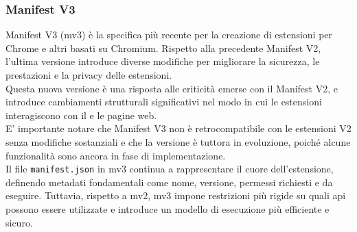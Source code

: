 \subsubsection{Manifest V3}
\noindent Manifest V3 (\acrshort{mv3}) è la specifica più recente per la creazione di estensioni per Chrome e altri  basati su Chromium. Rispetto alla precedente Manifest V2, l'ultima versione introduce diverse modifiche per migliorare la sicurezza, le prestazioni e la privacy delle estensioni.  \\
Questa nuova versione è una risposta alle criticità emerse con il Manifest V2, e introduce cambiamenti strutturali significativi nel modo in cui le estensioni interagiscono con il  e le pagine web.\\
E' importante notare che Manifest V3 non è retrocompatibile con le estensioni V2 senza modifiche sostanziali e che la versione è tuttora in evoluzione, poiché alcune funzionalità sono ancora in fase di implementazione.\\
Il file \texttt{manifest.json} in \acrshort{mv3} continua a rappresentare il cuore dell’estensione, definendo metadati fondamentali come nome, versione, permessi richiesti e  da eseguire. Tuttavia, rispetto a \acrshort{mv2}, \acrshort{mv3} impone restrizioni più rigide su quali \acrshort{api} possono essere utilizzate e introduce un modello di esecuzione più efficiente e sicuro.\\

